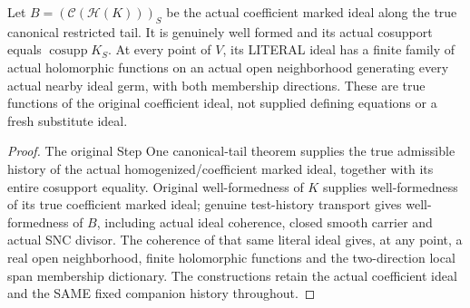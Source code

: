 \begin{theorem}
\label{hir:original-frozen-companion-coherent-coefficient-presentation}
\leanok
{}
Let $B=(\mathcal C(\mathcal H(K)))_S$ be the actual coefficient marked
ideal along the true canonical restricted tail. It is genuinely well
formed and its actual cosupport equals $\operatorname{cosupp}K_S$.
At every point of $V$, its LITERAL ideal has a finite family of actual
holomorphic functions on an actual open neighborhood generating every
actual nearby ideal germ, with both membership directions. These are
true functions of the original coefficient ideal, not supplied defining
equations or a fresh substitute ideal.
\end{theorem}
\begin{proof}
The original Step One canonical-tail theorem supplies the true admissible
history of the actual homogenized/coefficient marked ideal, together with
its entire cosupport equality. Original well-formedness of $K$ supplies
well-formedness of its true coefficient marked ideal; genuine test-history
transport gives well-formedness of $B$, including actual ideal coherence,
closed smooth carrier and actual SNC divisor. The coherence of that same
literal ideal gives, at any point, a real open neighborhood, finite
holomorphic functions and the two-direction local span membership
dictionary. The constructions retain the actual coefficient ideal and
the SAME fixed companion history throughout.
\end{proof}

